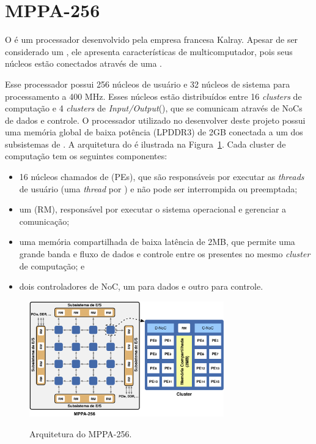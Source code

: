 \section{MPPA-256}
\label{sec:mppa}

O \mppa é um processador \manycore desenvolvido pela empresa francesa Kalray. Apesar de ser considerado um \manycore, ele apresenta características de multicomputador, pois seus núcleos estão conectados através de uma \noc.

Esse processador possui 256 núcleos de usuário e 32 núcleos de sistema para processamento a 400 MHz. Esses núcleos estão distribuídos entre 16 \textit{clusters} de computação e 4 \textit{clusters} de \textit{Input/Output}(\io), que se comunicam através de NoCs de dados e controle. O processador utilizado no desenvolver deste projeto possui uma memória global de baixa potência (LPDDR3) de 2GB conectada a um dos subsistemas de \io. A arquitetura do \mppa é ilustrada na Figura~\ref{fig:mppaOverall}. Cada cluster de computação tem os seguintes componentes:

\begin{itemize}
    \item 16 núcleos chamados de \pes (PEs), que são responsáveis por executar as \textit{threads} de usuário (uma \textit{thread} por \pe) e não pode ser interrompida ou preemptada;
    
    \item um \rman (RM), responsável por executar o sistema operacional e gerenciar a comunicação;
    
    \item uma memória compartilhada de baixa latência de 2MB, que permite uma grande banda e fluxo de dados e controle entre os \pes presentes no mesmo \textit{cluster} de computação; e
    
    \item dois controladores de NoC, um para dados e outro para controle.
    
\end{itemize}

\begin{figure}
    \centering
    \caption{Arquitetura do MPPA-256.}
    \includegraphics[width=0.75\textwidth]{figs/mppa-overview.pdf} \\
    \label{fig:mppaOverall}
\end{figure}

